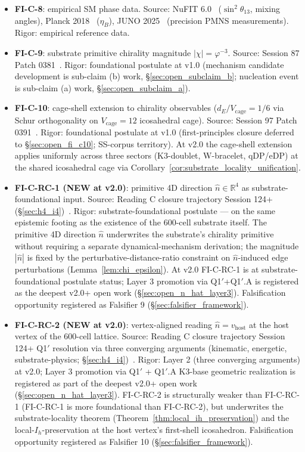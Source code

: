 \documentclass[11pt,letterpaper]{article}
\newcommand{\phig}{\varphi}
\begin{document}
\begin{itemize}
    \item \textbf{FI-C-8}: empirical SM phase data. Source: NuFIT 6.0~\cite{nufit_60} ($\sin^2\theta_{13}$, mixing angles), Planck 2018~\cite{planck_2018} ($\eta_B$), JUNO 2025~\cite{juno_2025} (precision PMNS measurements). Rigor: empirical reference data.
    \item \textbf{FI-C-9}: substrate primitive chirality magnitude $|\chi| = \phig^{-3}$. Source: Session 87 Patch 0381~\cite{abshier_capotauro_closure_sketch}. Rigor: foundational postulate at v1.0 (mechanism candidate development is sub-claim (b) work, \S\ref{sec:open_subclaim_b}; nucleation event is sub-claim (a) work, \S\ref{sec:open_subclaim_a}).
    \item \textbf{FI-C-10}: cage-shell extension to chirality observables ($d_E/V_\text{cage} = 1/6$ via Schur orthogonality on $V_\text{cage} = 12$ icosahedral cage). Source: Session 97 Patch 0391~\cite{abshier_capotauro_subclaim_c_sketch}. Rigor: foundational postulate at v1.0 (first-principles closure deferred to \S\ref{sec:open_fi_c10}; SS-corpus territory). At v2.0 the cage-shell extension applies uniformly across three sectors (K3-doublet, W-bracelet, qDP/eDP) at the shared icosahedral cage via Corollary~\ref{cor:substrate_locality_unification}.
    \item \textbf{FI-C-RC-1 (NEW at v2.0)}: primitive 4D direction $\hat{n} \in \mathbb{R}^4$ as substrate-foundational input. Source: Reading C closure trajectory Session 124+ (\S\ref{sec:h4_i4})~\cite{abshier_capotauro_chiral_mechanism_sketch}. Rigor: substrate-foundational postulate — on the same epistemic footing as the existence of the 600-cell substrate itself. The primitive 4D direction $\hat{n}$ underwrites the substrate's chirality primitive without requiring a separate dynamical-mechanism derivation; the magnitude $|\hat{n}|$ is fixed by the perturbative-distance-ratio constraint on $\hat{n}$-induced edge perturbations (Lemma~\ref{lem:chi_epsilon}). At v2.0 FI-C-RC-1 is at substrate-foundational postulate status; Layer 3 promotion via Q1$'$+Q1$'$.A is registered as the deepest v2.0+ open work (\S\ref{sec:open_n_hat_layer3}). Falsification opportunity registered as Falsifier 9 (\S\ref{sec:falsifier_framework}).
    \item \textbf{FI-C-RC-2 (NEW at v2.0)}: vertex-aligned reading $\hat{n} = v_{\text{host}}$ at the host vertex of the 600-cell lattice. Source: Reading C closure trajectory Session 124+ Q1$'$ resolution via three converging arguments (kinematic, energetic, substrate-physics; \S\ref{sec:h4_i4})~\cite{abshier_capotauro_chiral_mechanism_sketch}. Rigor: Layer 2 (three converging arguments) at v2.0; Layer 3 promotion via Q1$'$ + Q1$'$.A K3-base geometric realization is registered as part of the deepest v2.0+ open work (\S\ref{sec:open_n_hat_layer3}). FI-C-RC-2 is structurally weaker than FI-C-RC-1 (FI-C-RC-1 is more foundational than FI-C-RC-2), but underwrites the substrate-locality theorem (Theorem~\ref{thm:local_ih_preservation}) and the local-$I_h$-preservation at the host vertex's first-shell icosahedron. Falsification opportunity registered as Falsifier 10 (\S\ref{sec:falsifier_framework}).
\end{itemize}
\end{document}
